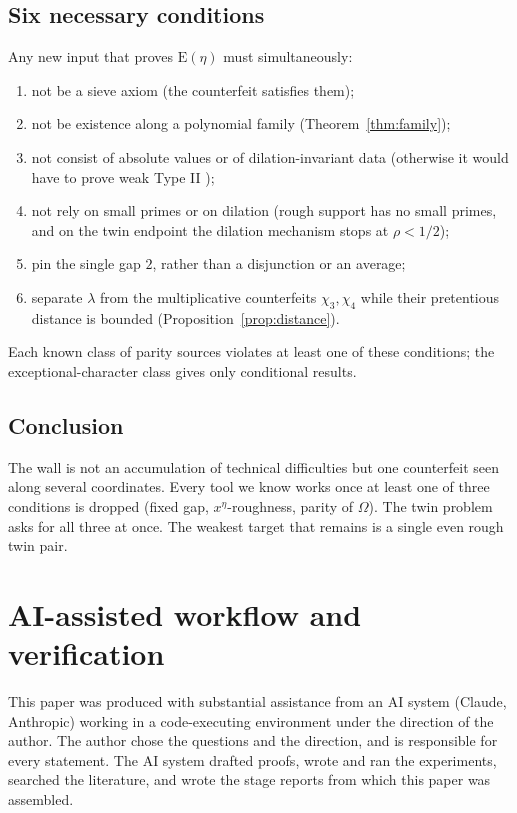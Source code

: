 \documentclass[11pt]{amsart}
\theoremstyle{definition}
\theoremstyle{remark}
\newcommand{\EE}{\mathrm E}
\begin{document}
\subsection{Six necessary conditions}
Any new input that proves $\EE(\eta)$ must simultaneously:
\begin{enumerate}
\item not be a sieve axiom (the counterfeit satisfies them);
\item not be existence along a polynomial family (Theorem~\ref{thm:family});
\item not consist of absolute values or of dilation-invariant data (otherwise it would have to prove weak Type II \cite{Wan26b});
\item not rely on small primes or on dilation (rough support has no small primes, and on the twin endpoint the dilation mechanism stops at $\rho<1/2$);
\item pin the single gap $2$, rather than a disjunction or an average;
\item separate $\lambda$ from the multiplicative counterfeits $\chi_3,\chi_4$ while their pretentious distance is bounded (Proposition~\ref{prop:distance}).
\end{enumerate}
Each known class of parity sources violates at least one of these conditions; the exceptional-character class gives only conditional results.

\subsection{Conclusion}
The wall is not an accumulation of technical difficulties but one counterfeit seen along several coordinates. Every tool we know works once at least one of three conditions is dropped (fixed gap, $x^\eta$-roughness, parity of $\Omega$). The twin problem asks for all three at once. The weakest target that remains is a single even rough twin pair.

\appendix
\section{AI-assisted workflow and verification}\label{app:ai}

This paper was produced with substantial assistance from an AI system (Claude, Anthropic) working in a code-executing environment under the direction of the author. The author chose the questions and the direction, and is responsible for every statement. The AI system drafted proofs, wrote and ran the experiments, searched the literature, and wrote the stage reports from which this paper was assembled.
\end{document}
